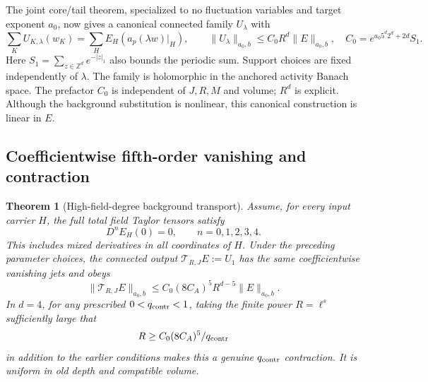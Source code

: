\documentclass[11pt]{article}
\newtheorem{theorem}{Theorem}[section]
\theoremstyle{remark}
\begin{document}
The joint core/tail theorem, specialized to no fluctuation
variables and target exponent $a_0$, now gives a canonical
connected family $U_\lambda$ with
\begin{equation}
 \sum_KU_{K,\lambda}(w_K)
   =\sum_HE_H(a_p(\lambda w)|_H),\qquad
 \|U_\lambda\|_{a_0,b}\leq C_0R^d\|E\|_{a_0,b},
 \quad
 C_0=e^{a_0 5^d2^d+2d}S_1.
 \label{cdh-uniform-transport}
\end{equation}
Here $S_1=\sum_{z\in\mathbb Z^d}e^{-|z|_1}$ also bounds the
periodic sum. Support choices are fixed independently of
$\lambda$. The family is holomorphic in the anchored activity
Banach space. The prefactor $C_0$ is independent of $J,R,M$ and
volume; $R^d$ is explicit. Although the background substitution
is nonlinear, this canonical construction is linear in $E$.

\subsection{Coefficientwise fifth-order vanishing and contraction}
\label{cdh-contraction-section}

\begin{theorem}[High-field-degree background transport]
\label{cdh-contraction}
Assume, for every input carrier $H$, the full total field
Taylor tensors satisfy
\begin{equation}
 D^nE_H(0)=0,\qquad n=0,1,2,3,4.
 \label{cdh-jet-condition}
\end{equation}
This includes mixed derivatives in all coordinates of $H$.
Under the preceding parameter choices, the connected output
$\mathcal T_{R,J}E:=U_1$ has the same coefficientwise vanishing
jets and obeys
\begin{equation}
 \|\mathcal T_{R,J}E\|_{a_0,b}
 \leq C_0(8C_A)^5R^{d-5}\|E\|_{a_0,b}.
 \label{cdh-general-contraction}
\end{equation}
In $d=4$, for any prescribed $0<q_{\rm contr}<1$, taking the
finite power $R=\ell^s$ sufficiently large that
\begin{equation}
 R\geq C_0(8C_A)^5/q_{\rm contr}
 \label{cdh-R-contraction}
\end{equation}
in addition to the earlier conditions makes this a genuine
$q_{\rm contr}$ contraction. It is uniform in old depth and
compatible volume.
\end{theorem}
\end{document}
